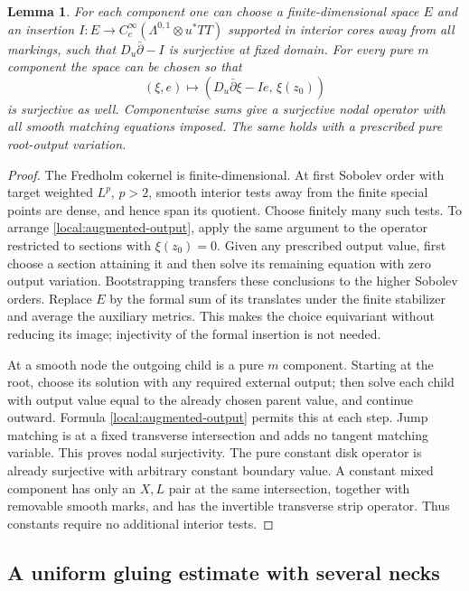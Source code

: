 \documentclass[11pt]{article}
\newtheorem{lemma}[theorem]{Lemma}
\theoremstyle{definition}
\theoremstyle{remark}
\numberwithin{equation}{section}
\begin{document}
\begin{lemma}\label{local:augmentation}
For each component one can choose a finite-dimensional space $E$ and
an insertion $I:E\to C_c^\infty(\Lambda^{0,1}\otimes u^*TT)$ supported
in interior cores away from all markings, such that $D_u\bar\partial-I$
is surjective at fixed domain.  For every pure $m$ component the space
can be chosen so that
\begin{equation}\label{local:augmented-output}
 (\xi,e)\longmapsto
 (D_u\bar\partial\xi-Ie,\,\xi(z_0))
\end{equation}
is surjective as well.  Componentwise sums give a surjective nodal
operator with all smooth matching equations imposed.  The same holds
with a prescribed pure root-output variation.
\end{lemma}
\begin{proof}
The Fredholm cokernel is finite-dimensional.  At first Sobolev order
with target weighted $L^p$, $p>2$, smooth interior tests away from the
finite special points are dense, and hence span its quotient.  Choose
finitely many such tests.  To arrange \eqref{local:augmented-output},
apply the same argument to the operator restricted to sections with
$\xi(z_0)=0$.  Given any prescribed output value, first choose a
section attaining it and then solve its remaining equation with zero
output variation.  Bootstrapping transfers these conclusions to the
higher Sobolev orders.  Replace $E$ by the formal sum of its translates
under the finite stabilizer and average the auxiliary metrics.  This
makes the choice equivariant without reducing its image; injectivity
of the formal insertion is not needed.

At a smooth node the outgoing child is a pure $m$ component.  Starting
at the root, choose its solution with any required external output;
then solve each child with output value equal to the already chosen
parent value, and continue outward.  Formula
\eqref{local:augmented-output} permits this at each step.  Jump
matching is at a fixed transverse intersection and adds no tangent
matching variable.  This proves nodal surjectivity.  The pure constant
disk operator is already surjective with arbitrary constant boundary
value.  A constant mixed component has only an $X,L$ pair at the same
intersection, together with removable smooth marks, and has the
invertible transverse strip operator.  Thus constants require no
additional interior tests.
\end{proof}

\subsection{A uniform gluing estimate with several necks}
\end{document}
